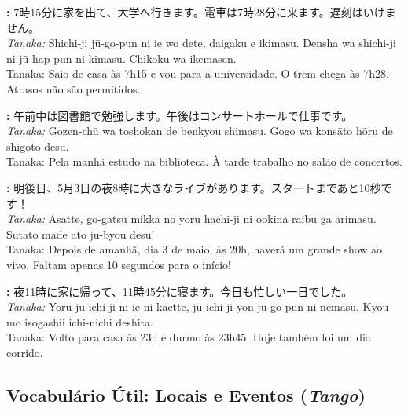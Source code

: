 \documentclass[12pt,a4paper]{article}
\begin{document}
\vspace{0.5em}

\textbf{:} 7時15分に家を出て、大学へ行きます。電車は7時28分に来ます。遅刻はいけません。\\
\textit{Tanaka:} Shichi-ji jū-go-pun ni ie wo dete, daigaku e ikimasu. Densha wa shichi-ji ni-jū-hap-pun ni kimasu. Chikoku wa ikemasen.\\
Tanaka: Saio de casa às 7h15 e vou para a universidade. O trem chega às 7h28. Atrasos não são permitidos.

\vspace{0.5em}

\textbf{:} 午前中は図書館で勉強します。午後はコンサートホールで仕事です。\\
\textit{Tanaka:} Gozen-chū wa toshokan de benkyou shimasu. Gogo wa konsāto hōru de shigoto desu.\\
Tanaka: Pela manhã estudo na biblioteca. À tarde trabalho no salão de concertos.

\vspace{0.5em}

\textbf{:} 明後日、5月3日の夜8時に大きなライブがあります。スタートまであと10秒です！\\
\textit{Tanaka:} Asatte, go-gatsu mikka no yoru hachi-ji ni ookina raibu ga arimasu. Sutāto made ato jū-byou desu!\\
Tanaka: Depois de amanhã, dia 3 de maio, às 20h, haverá um grande show ao vivo. Faltam apenas 10 segundos para o início!

\vspace{0.5em}

\textbf{:} 夜11時に家に帰って、11時45分に寝ます。今日も忙しい一日でした。\\
\textit{Tanaka:} Yoru jū-ichi-ji ni ie ni kaette, jū-ichi-ji yon-jū-go-pun ni nemasu. Kyou mo isogashii ichi-nichi deshita.\\
Tanaka: Volto para casa às 23h e durmo às 23h45. Hoje também foi um dia corrido.

\newpage

\subsection*{Vocabulário Útil: Locais e Eventos (\textit{Tango})}

\vspace{0.2cm}
\end{document}
